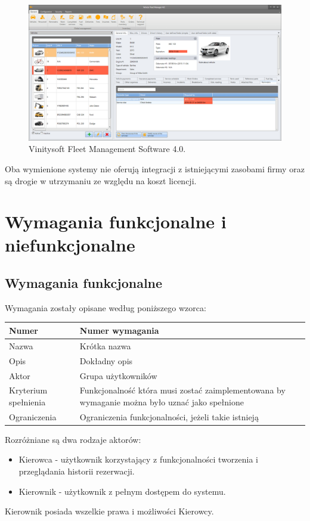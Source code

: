\documentclass[eng,printmode,openany]{mgr}
\begin{document}
	\begin{figure}[H]
		\centering
		\includegraphics[width=\textwidth]{images/vinitysoft.png}
		\caption{Vinitysoft Fleet Management Software 4.0.}
	\end{figure}
	
	Oba wymienione systemy nie oferują integracji z istniejącymi zasobami firmy oraz są drogie w utrzymaniu ze względu na koszt licencji.
	\newpage
	\chapter{Wymagania funkcjonalne i niefunkcjonalne}
	\section{Wymagania funkcjonalne}
	Wymagania zostały opisane według poniższego wzorca:
	\begin{table}[H]
		\begin{tabularx}{\textwidth}{|l|X|}
			\hline
			Numer                & Numer wymagania \\ \hline
			Nazwa                & Krótka nazwa\\ \hline
			Opis                 & Dokładny opis\\ \hline
			Aktor                & Grupa użytkowników\\ \hline
			Kryterium spełnienia & Funkcjonalność która musi zostać zaimplementowana by wymaganie można było uznać jako spełnione\\ \hline
			Ograniczenia         & Ograniczenia funkcjonalności, jeżeli takie istnieją\\ \hline
		\end{tabularx}
	\end{table}
	Rozróżniane są dwa rodzaje aktorów:
	\begin{itemize}
		\item Kierowca - użytkownik korzystający z funkcjonalności tworzenia i przeglądania historii rezerwacji.
		\item Kierownik - użytkownik z pełnym dostępem do systemu.
	\end{itemize}
	Kierownik posiada wszelkie prawa i możliwości Kierowcy.
	
\end{document}
